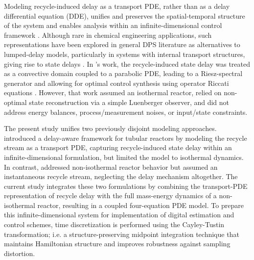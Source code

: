 Modeling recycle-induced delay as a transport PDE, rather than as a delay differential equation (DDE), unifies and preserves the spatial-temporal structure of the system and enables analysis within an infinite-dimensional control framework \autocite{Krstic2009Delay}. Although rare in chemical engineering applications, such representations have been explored in general DPS literature as alternatives to lumped-delay models, particularly in systems with internal transport structures, giving rise to state delays \autocite{Qi2021Output,Cassol2019Heat}. In 's work, the recycle-induced state delay was treated as a convective domain coupled to a parabolic PDE, leading to a Riesz-spectral generator and allowing for optimal control synthesis using operator Riccati equations \autocite{moadeli2025optimal}. However, that work assumed an isothermal reactor, relied on non-optimal state reconstruction via a simple Luenberger observer, and did not address energy balances, process/measurement noises, or input/state constraints.

The present study unifies two previously disjoint modeling approaches.  \autocite{moadeli2025optimal} introduced a delay-aware framework for tubular reactors by modeling the recycle stream as a transport PDE, capturing recycle-induced state delay within an infinite-dimensional formulation, but limited the model to isothermal dynamics. In contrast,  \autocite{Khatibi2021Model} addressed non-isothermal reactor behavior but assumed an instantaneous recycle stream, neglecting the delay mechanism altogether. The current study integrates these two formulations by combining the transport-PDE representation of recycle delay with the full mass-energy dynamics of a non-isothermal reactor, resulting in a coupled four-equation PDE model. To prepare this infinite-dimensional system for implementation of digital estimation and control schemes, time discretization is performed using the Cayley-Tustin transformation; i.e. a structure-preserving midpoint integration technique that maintains Hamiltonian structure and improves robustness against sampling distortion\autocite{havu2007cayley, xu2017linear}.

